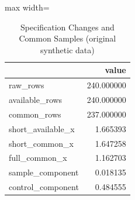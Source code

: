 \begin{table}[htbp]
\centering
\caption{Specification Changes and Common Samples (original synthetic data)}
\begingroup
\small
\setlength{\tabcolsep}{6pt}
\renewcommand{\arraystretch}{1.12}
\begin{adjustbox}{max width=\linewidth}
\begin{tabular}{@{}lr@{}}
\toprule
 & value \\
\midrule
raw\_rows & 240.000000 \\
available\_rows & 240.000000 \\
common\_rows & 237.000000 \\
short\_available\_x & 1.665393 \\
short\_common\_x & 1.647258 \\
full\_common\_x & 1.162703 \\
sample\_component & 0.018135 \\
control\_component & 0.484555 \\
\bottomrule
\end{tabular}
\end{adjustbox}
\endgroup
\end{table}